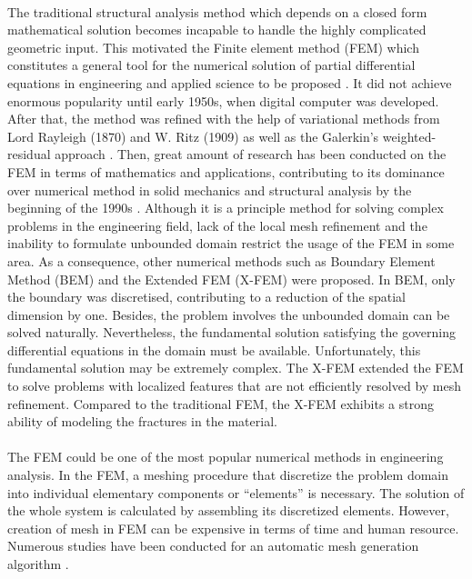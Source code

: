 \paragraph{}
The traditional structural analysis method which depends on a closed form mathematical solution becomes incapable to handle the highly complicated geometric input.
This motivated the Finite element method (FEM) which constitutes a general tool for the numerical solution of partial differential equations in engineering and applied science to be proposed \citep{Ucb2010}.
It did not achieve enormous popularity until early 1950s, when digital computer was developed.
After that, the method was refined with the help of variational methods from Lord Rayleigh (1870) and W. Ritz (1909) as well as the Galerkin's weighted-residual approach \citep{Fel1994}.
Then, great amount of research has been conducted on the FEM in terms of mathematics and applications, contributing to its dominance over numerical method in solid mechanics and structural analysis by the beginning of the 1990s \citep{Clo1980}.
Although it is a principle method for solving complex problems in the engineering field, lack of the local mesh refinement and the inability to formulate unbounded domain restrict the usage of the FEM in some area.
As a consequence, other numerical methods such as Boundary Element Method (BEM) \citep{Li2011,WARDLE1984525} and the Extended FEM (X-FEM) \citep{Moes1999} were proposed.
In BEM, only the boundary was discretised, contributing to a reduction of the spatial dimension by one.
Besides, the problem involves the unbounded domain can be solved naturally.
Nevertheless, the fundamental solution satisfying the governing differential equations in the domain must be available.
Unfortunately, this fundamental solution may be extremely complex.
The X-FEM extended the FEM to solve problems with localized features that are not efficiently resolved by mesh refinement.
Compared to the traditional FEM, the X-FEM exhibits a strong ability of modeling the fractures in the material.

\paragraph{}
The FEM could be one of the most popular numerical methods in engineering analysis.
In the FEM, a meshing procedure that discretize the problem domain into individual elementary components or ``elements'' is necessary.
The solution of the whole system is calculated by assembling its discretized elements.
However, creation of mesh in FEM can be expensive in terms of time and human resource.
Numerous studies have been conducted for an automatic mesh generation algorithm \citep{owen2000,Blacker1993,doi:10.1002/fld.1650081003,doi:10.1093/comjnl/24.2.167}.


